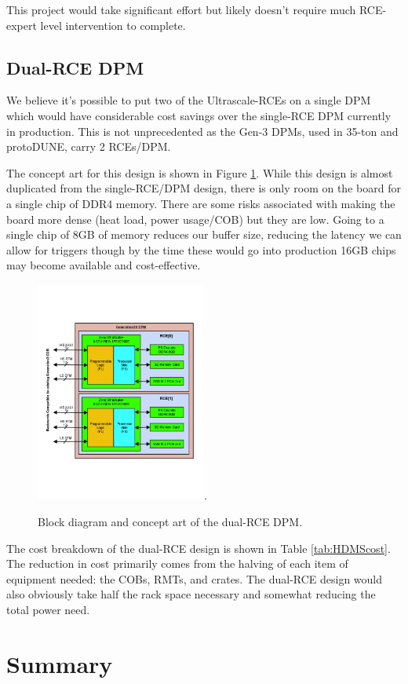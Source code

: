  This project would take significant effort but likely doesn't require much RCE-expert level intervention to complete.  

\subsection{Dual-RCE DPM}
\label{sec:dualRCE}
We believe it's possible to put two of the Ultrascale-RCEs on a single DPM which would have considerable cost savings over the single-RCE DPM currently in production.  This is not unprecedented as the Gen-3 DPMs, used in 35-ton and protoDUNE, carry 2 RCEs/DPM.  

The concept art for this design is shown in Figure \ref{fig:dualRCE}.  While this design is almost duplicated from the single-RCE/DPM design, there is only room on the board for a single chip of DDR4 memory.  There are some risks associated with making the board more dense (heat load, power usage/COB) but they are low.  Going to a single chip of 8GB of memory reduces our buffer size, reducing the latency we can allow for triggers though by the time these would go into production 16GB chips may become available and cost-effective.  

\begin{figure}[tb]
\centering
\includegraphics[width=0.5\textwidth]{images/dual-RCE-DPM.pdf}.
\caption{\label{fig:dualRCE}Block diagram and concept art of the dual-RCE DPM.}
\end{figure}

The cost breakdown of the dual-RCE design is shown in Table \ref{tab:HDMScost}.  The reduction in cost primarily comes from the halving of each item of equipment needed: the COBs, RMTs, and crates.  The dual-RCE design would also obviously take half the rack space necessary and somewhat reducing the total power need. 

\section{Summary}






